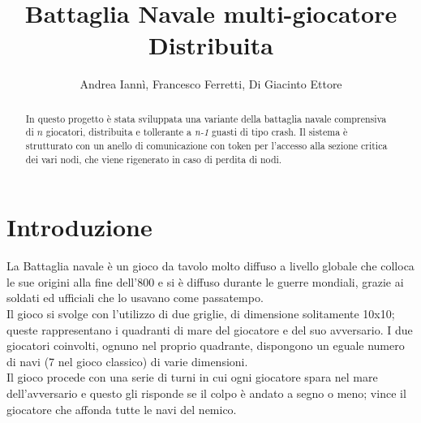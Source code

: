 \documentclass{llncs}
\begin{document}
%
\frontmatter          %
%
\pagestyle{headings}  %

%
\mainmatter              %
%
\title{Battaglia Navale multi-giocatore Distribuita}
%
%
\author{Andrea Iannì, Francesco Ferretti, Di Giacinto Ettore}
%
%
%

\maketitle              %

\begin{abstract}
In questo progetto è stata sviluppata una variante della battaglia navale comprensiva di $n$ giocatori, distribuita e tollerante a \emph{n-1} guasti di tipo crash. Il sistema è strutturato con un anello di comunicazione con token per l'accesso alla sezione critica dei vari nodi, che viene rigenerato in caso di perdita di nodi.
\end{abstract}

\section{Introduzione}
La Battaglia navale è un gioco da tavolo molto diffuso a livello globale che colloca le sue origini alla fine dell'800 e si è diffuso durante le guerre mondiali, grazie ai soldati ed ufficiali che lo usavano come passatempo.\\
Il gioco si svolge con l'utilizzo di due griglie, di dimensione solitamente 10x10; queste rappresentano i quadranti di mare del giocatore e del suo avversario. I due giocatori coinvolti, ognuno nel proprio quadrante, dispongono un eguale numero di navi (7 nel gioco classico) di varie dimensioni.\\
Il gioco procede con una serie di turni in cui ogni giocatore spara nel mare dell'avversario e questo gli risponde se il colpo è andato a segno o meno; vince il giocatore che affonda tutte le navi del nemico.
\end{document}
